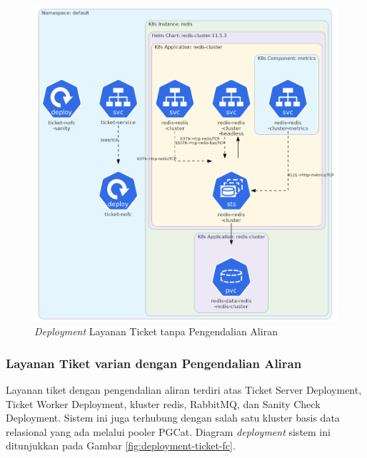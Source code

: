 \begin{figure}[H]
    \centering
    \includegraphics[width=1\textwidth]{resources/chapter-4/ticket-nofc.png}
    \caption{\textit{Deployment} Layanan Ticket tanpa Pengendalian Aliran}
    \label{fig:deployment-ticket-nofc}
\end{figure}

\pagebreak

\subsubsection{Layanan Tiket varian dengan Pengendalian Aliran}

Layanan tiket dengan pengendalian aliran terdiri atas Ticket Server Deployment, Ticket Worker Deployment, kluster redis, RabbitMQ, dan Sanity Check Deployment. Sistem ini juga terhubung dengan salah satu kluster basis data relasional yang ada melalui pooler PGCat. Diagram \textit{deployment} sistem ini ditunjukkan pada Gambar \ref{fig:deployment-ticket-fc}.

